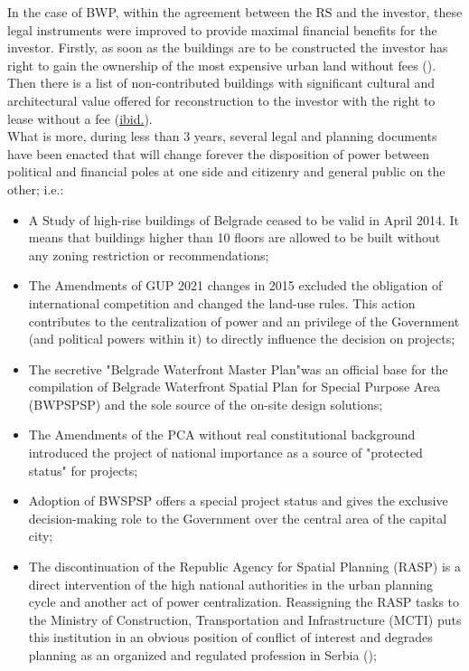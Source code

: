 \documentclass[11pt]{report}
\begin{document}
{In the case of BWP, within the agreement between the RS and the investor, these legal instruments were improved  to provide maximal financial benefits for the investor.
Firstly, as soon as the buildings are to be constructed the investor has right to gain the ownership of the most expensive urban land without fees (\href{JVA}{\cite{JVA}}).
Then there is a list of non-contributed buildings with significant cultural and architectural value offered for reconstruction to the investor with the right to lease without a fee (\href{JVA}{ibid.}).
\\

What is more, during less than 3 years, several legal and planning documents have been enacted that will change forever the disposition of power between political and financial poles at one side and citizenry and general public on the other; i.e.:

\begin{itemize}

\item A Study of high-rise buildings of Belgrade ceased to be valid in April 2014. It means that buildings higher than 10 floors are allowed to be built without any zoning restriction or recommendations;

\item The Amendments of GUP 2021 changes in 2015 excluded the obligation of international competition and changed the land-use rules.
This action contributes to the centralization of power and an privilege of the Government (and political powers within it) to directly influence the decision on projects;

\item The secretive "Belgrade Waterfront Master Plan"was an official base for the compilation of Belgrade Waterfront Spatial Plan for Special Purpose Area (BWPSPSP) and the sole source of the on-site design solutions;

\item  The Amendments of the PCA without real constitutional background introduced the project of national importance as a source of "protected status" for projects;

\item Adoption of BWSPSP offers a special project status and gives the exclusive decision-making role to the Government over the central area of the capital city; 

\item The discontinuation of the Republic Agency for Spatial Planning (RASP) is a direct intervention of the high national authorities in the urban planning cycle and another act of power centralization.
Reassigning the RASP tasks to the Ministry of Construction, Transportation and Infrastructure (MCTI) puts this institution in an obvious position of conflict of interest and degrades  planning as an organized and regulated profession in Serbia (\href{Stojkov}{\cite{stojkov_sahrana_2015}});


\end{itemize}}
\end{document}
